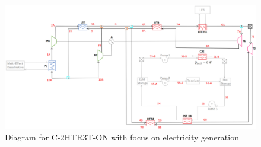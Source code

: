 \begin{figure}[H]
    \widefigure
    \includegraphics[width=\linewidth]{Definitions/c-2htr3t-on.pdf}
    \caption{Diagram for C-2HTR3T-ON with focus on electricity generation\label{c-2htr3t-on}}
\end{figure}

